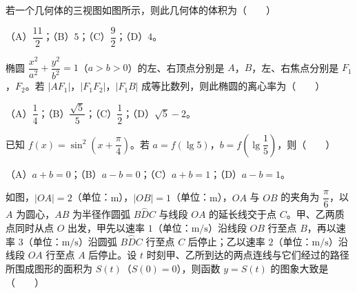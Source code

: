 \begin{question}
若一个几何体的三视图如图所示，则此几何体的体积为\mbox{（　　）}
\nopagebreak[4]
\begin{center}\end{center}
\nopagebreak[4]
（A）$\dfrac{11}2$；（B）$5$；（C）$\dfrac92$；（D）$4$。

\end{question}
\begin{question}
椭圆 $\dfrac{x^2}{a^2}+\dfrac{y^2}{b^2}=1$（$a>b>0$）的左、右顶点分别是 $A$，$B$，左、右焦点分别是 $F_1$，$F_2$。若 $|AF_1|$，$|F_1F_2|$，$|F_1B|$ 成等比数列，则此椭圆的离心率为\mbox{（　　）}

（A）$\dfrac14$；（B）$\dfrac{\sqrt5}5$；（C）$\dfrac12$；（D）$\sqrt5-2$。

\end{question}
\begin{question}
已知 $f(x)=\sin^2\left(x+\dfrac\pi4\right)$。若 $a=f(\lg5)$，$b=f\left(\lg\dfrac15\right)$，则\mbox{（　　）}

（A）$a+b=0$；（B）$a-b=0$；（C）$a+b=1$；（D）$a-b=1$。

\Needspace{0.4\textheight}
\end{question}
\begin{question}
如图，$|OA|=2$（单位：$\mathrm m$），$|OB|=1$（单位：$\mathrm m$），$OA$ 与 $OB$ 的夹角为 $\dfrac\pi6$，以 $A$ 为圆心，$AB$ 为半径作圆弧 $\overset{\frown}{BDC}$ 与线段 $OA$ 的延长线交于点 $C$。甲、乙两质点同时从点 $O$ 出发，甲先以速率 $1$（单位：$\mathrm m/\mathrm s$）沿线段 $OB$ 行至点 $B$，再以速率 $3$（单位：$\mathrm m/\mathrm s$）沿圆弧 $\overset{\frown}{BDC}$ 行至点 $C$ 后停止；乙以速率 $2$（单位：$\mathrm m/\mathrm s$）沿线段 $OA$ 行至点 $A$ 后停止。设 $t$ 时刻甲、乙所到达的两点连线与它们经过的路径所围成图形的面积为 $S(t)$（$S(0)=0$），则函数 $y=S(t)$ 的图象大致是\mbox{（　　）}
\nopagebreak[4]
\begin{center}\end{center}
\nopagebreak[4]
\end{question}

